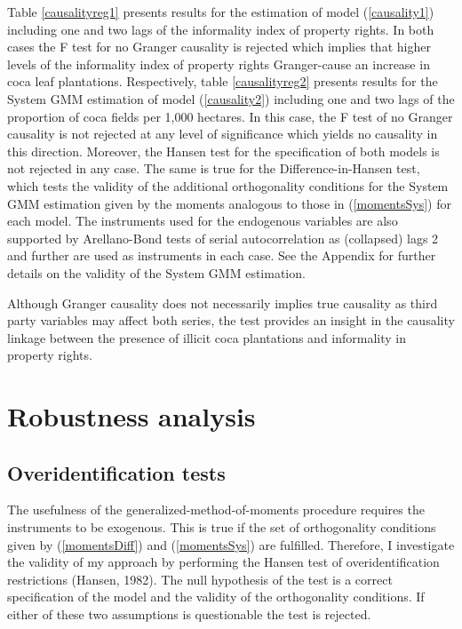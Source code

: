 \documentclass[a4paper, 12pt]{article}
\begin{document}
Table \ref{causalityreg1} presents results for the estimation of model (\ref{causality1}) including one and two lags of the informality index of property rights. In both cases the F test for no Granger causality is rejected which implies that higher levels of the informality index of property rights Granger-cause an increase in coca leaf plantations. Respectively, table \ref{causalityreg2} presents results for the System GMM estimation of model (\ref{causality2}) including one and two lags of the proportion of coca fields per 1,000 hectares. In this case, the F test of no Granger causality is not rejected at any level of significance which yields no causality in this direction. Moreover, the Hansen test for the specification of both models is not rejected in any case. The same is true for the Difference-in-Hansen test, which tests the validity of the additional orthogonality conditions for the System GMM estimation given by the moments analogous to those in (\ref{momentsSys}) for each model. The instruments used for the endogenous variables are also supported by Arellano-Bond tests of serial autocorrelation as (collapsed) lags 2 and further are used as instruments in each case. See the Appendix for further details on the validity of the System GMM estimation.

Although Granger causality does not necessarily implies true causality as third party variables may affect both series, the test provides an insight in the causality linkage between the presence of illicit coca plantations and informality in property rights.

\section{Robustness analysis}

\subsection{Overidentification tests}
\label{overid}

The usefulness of the generalized-method-of-moments procedure requires the instruments to be exogenous. This is true if the set of orthogonality conditions given by (\ref{momentsDiff}) and (\ref{momentsSys}) are fulfilled. Therefore, I investigate the validity of my approach by performing the Hansen test of overidentification restrictions (Hansen, 1982). The null hypothesis of the test is a correct specification of the model and the validity of the orthogonality conditions. If either of these two assumptions is questionable the test is rejected.
\end{document}
